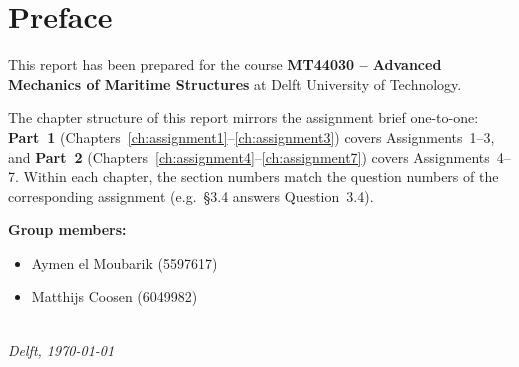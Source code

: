 \chapter{Preface}

This report has been prepared for the course \textbf{MT44030 -- Advanced Mechanics of Maritime Structures} at Delft University of Technology.

The chapter structure of this report mirrors the assignment brief one-to-one: \textbf{Part~1} (Chapters~\ref{ch:assignment1}--\ref{ch:assignment3}) covers Assignments~1--3, and \textbf{Part~2} (Chapters~\ref{ch:assignment4}--\ref{ch:assignment7}) covers Assignments~4--7. Within each chapter, the section numbers match the question numbers of the corresponding assignment (e.g.\ \S3.4 answers Question~3.4).

\bigskip
\noindent\textbf{Group members:}
\begin{itemize}
  \item Aymen el Moubarik (5597617)
  \item Matthijs Coosen (6049982)
\end{itemize}

\bigskip
{}

\begin{flushright}
{\makeatletter\itshape
  \@author\\
  Delft, \today
\makeatother}%
\end{flushright}
